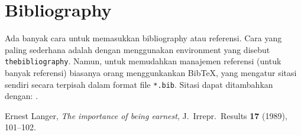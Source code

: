 \documentclass[12pt]{article}
\begin{document}
\section{Bibliography}
Ada banyak cara untuk memasukkan bibliography atau referensi. Cara yang paling sederhana adalah dengan menggunakan environment yang disebut \texttt{thebibliography}.  Namun, untuk memudahkan manajemen referensi (untuk banyak referensi) biasanya orang menggunkankan BibTeX, yang mengatur sitasi sendiri secara terpisah dalam format file \texttt{*.bib}.  Sitasi dapat ditambahkan dengan: \cite{langer1989}.

\begin{thebibliography}{9}

 Ernest Langer, \textit{The importance of being earnest}, J.\ Irrepr.\ Results \textbf{17} (1989), 101--102.

\end{thebibliography}
\end{document}
